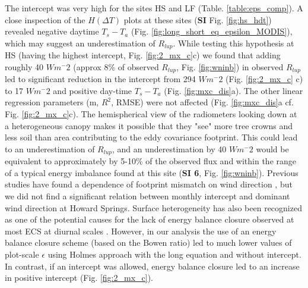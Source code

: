 \documentclass[fleqn,10pt]{wlscirep}
\begin{document}
{{ The intercept was very high for the sites HS and LF (Table. \ref{table:eps_comp}). A close inspection of the $H(\Delta T)$ plots at these sites (\textbf{SI} Fig. \ref{fig:hs_hdt}) revealed negative daytime $T_{s} -T_{a}$ (Fig. \ref{fig:long_short_eq_epsilon_MODIS}), which may suggest an underestimation of $R_{lup}$. While testing this hypothesis at HS (having the highest intercept, Fig. \ref{fig:2_mx_c}c) we found that  adding roughly 40 $Wm^-{2}$ (approx 8\% of observed $R_{lup}$, Fig. \ref{fig:wninb}) in observed $R_{lup}$ led to significant reduction in the intercept from 294 $Wm^-{2}$ (Fig. \ref{fig:2_mx_c} c) to 17 $Wm^-{2}$ and positive day-time $T_{s} - T_{a}$ (Fig. \ref{fig:mxc_dis}a). The other linear regression parameters (m, $R^{2}$, RMSE) were not affected (Fig. \ref{fig:mxc_dis}a cf. Fig. \ref{fig:2_mx_c}c). The hemispherical view of the radiometers looking down at a heterogeneous canopy makes it possible that they "see" more tree crowns and less soil than area contributing to the eddy covariance footprint. This could lead to an underestimation of $R_{lup}$, and an underestimation by 40 $Wm^-{2}$ would be equivalent to approximately by 5-10$\%$ of the observed flux and within the range of a typical energy imbalance found at this site (\textbf{SI 6}, Fig. \ref{fig:wninb}). 
 Previous studies have found a dependence of footprint mismatch on wind direction \cite{chu2021representativeness,marcolla2018geometry,morillas2013using}, but we did not find a significant relation between monthly intercept and dominant wind direction at Howard Springs. %
Surface heterogeneity has also been recognized as one of the potential causes for the lack of energy balance closure observed at most ECS at diurnal scales \cite{wilson2002energy, stoy2013data}. However, in our analysis the use of an energy balance closure scheme (based on the Bowen ratio) led to much lower values of plot-scale $\epsilon$ using Holmes approach with the long equation and without intercept. In contrast, if an intercept was allowed, energy balance closure led to an increase in positive intercept (Fig. \ref{fig:2_mx_c}). %
}}
\end{document}
